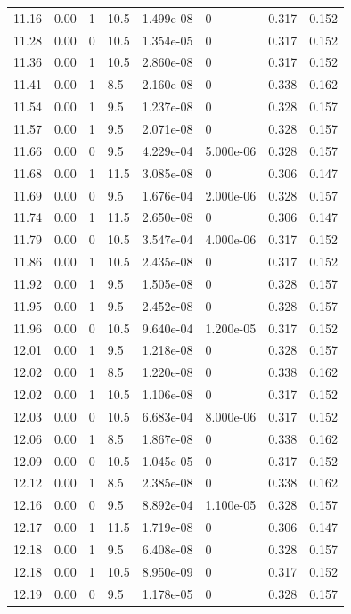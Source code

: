 \documentclass[preview]{standalone}
\begin{document}
{{{\begin{tabular}{L{1.2cm}C{1.2cm} C{0.3cm}C{0.5cm} C{1.4cm}C{1.4cm} C{1.4cm}C{1.4cm}}
  11.16  &  0.00  & 1     & 10.5 &  1.499e-08  & 0  & 0.317 &  0.152   \\ 
  11.28  &  0.00  & 0     & 10.5 &  1.354e-05  & 0  & 0.317 &  0.152   \\ 
  11.36  &  0.00  & 1     & 10.5 &  2.860e-08  & 0  & 0.317 &  0.152   \\ 
  11.41  &  0.00  & 1     & 8.5 &  2.160e-08  & 0  & 0.338 &  0.162   \\ 
  11.54  &  0.00  & 1     & 9.5 &  1.237e-08  & 0  & 0.328 &  0.157   \\ 
  11.57  &  0.00  & 1     & 9.5 &  2.071e-08  & 0  & 0.328 &  0.157   \\ 
  11.66  &  0.00  & 0     & 9.5 &  4.229e-04  & 5.000e-06  & 0.328 &  0.157   \\ 
  11.68  &  0.00  & 1     & 11.5 &  3.085e-08  & 0  & 0.306 &  0.147   \\ 
  11.69  &  0.00  & 0     & 9.5 &  1.676e-04  & 2.000e-06  & 0.328 &  0.157   \\ 
  11.74  &  0.00  & 1     & 11.5 &  2.650e-08  & 0  & 0.306 &  0.147   \\ 
  11.79  &  0.00  & 0     & 10.5 &  3.547e-04  & 4.000e-06  & 0.317 &  0.152   \\ 
  11.86  &  0.00  & 1     & 10.5 &  2.435e-08  & 0  & 0.317 &  0.152   \\ 
  11.92  &  0.00  & 1     & 9.5 &  1.505e-08  & 0  & 0.328 &  0.157   \\ 
  11.95  &  0.00  & 1     & 9.5 &  2.452e-08  & 0  & 0.328 &  0.157   \\ 
  11.96  &  0.00  & 0     & 10.5 &  9.640e-04  & 1.200e-05  & 0.317 &  0.152   \\ 
  12.01  &  0.00  & 1     & 9.5 &  1.218e-08  & 0  & 0.328 &  0.157   \\ 
  12.02  &  0.00  & 1     & 8.5 &  1.220e-08  & 0  & 0.338 &  0.162   \\ 
  12.02  &  0.00  & 1     & 10.5 &  1.106e-08  & 0  & 0.317 &  0.152   \\ 
  12.03  &  0.00  & 0     & 10.5 &  6.683e-04  & 8.000e-06  & 0.317 &  0.152   \\ 
  12.06  &  0.00  & 1     & 8.5 &  1.867e-08  & 0  & 0.338 &  0.162   \\ 
  12.09  &  0.00  & 0     & 10.5 &  1.045e-05  & 0  & 0.317 &  0.152   \\ 
  12.12  &  0.00  & 1     & 8.5 &  2.385e-08  & 0  & 0.338 &  0.162   \\ 
  12.16  &  0.00  & 0     & 9.5 &  8.892e-04  & 1.100e-05  & 0.328 &  0.157   \\ 
  12.17  &  0.00  & 1     & 11.5 &  1.719e-08  & 0  & 0.306 &  0.147   \\ 
  12.18  &  0.00  & 1     & 9.5 &  6.408e-08  & 0  & 0.328 &  0.157   \\ 
  12.18  &  0.00  & 1     & 10.5 &  8.950e-09  & 0  & 0.317 &  0.152   \\ 
  12.19  &  0.00  & 0     & 9.5 &  1.178e-05  & 0  & 0.328 &  0.157   \\ 
\hline 
\end{tabular} 

}}}
\end{document}
